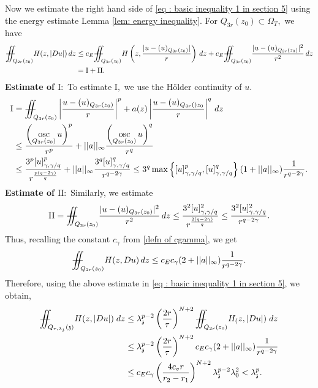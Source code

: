 \documentclass[notitlepage,11pt,reqno]{amsart}
\theoremstyle{definition}
\numberwithin{equation}{section}
\DeclareMathOperator*{\osc}{osc}
\newcommand{\iintss}{{\int\hspace{-0.28cm}\int}}
\newcommand{ \miints }{{\iintss\hspace{-0.56cm} -\hspace{-0.15cm}-}}
\newcommand{\miint}[1]{{\miints_{\hspace{-0.13cm}#1}}}
\begin{document}
Now we estimate the right hand side of \eqref{eq : basic inequality 1 in section 5} using the energy estimate Lemma \ref{lem: energy inequality}. For $Q_{3r}(z_0) \subset \Omega_T,$ we have
\begin{align*}
  \miint{Q_{2r}(z_0)}H(z, |Du|)\, dz &\leq c_E \miint{Q_{3r}(z_0)} H\left(z, \frac{|u-(u)_{Q_{3r}(z_0)}|}{r}\right)\, dz+c_E \miint{Q_{3r}(z_0)}\frac{|u-(u)_{Q_{3r}(z_0)}|^2}{r^2}\, dz\\
  &=\mathrm{I}+\mathrm{II}.
\end{align*}
\textbf{Estimate of $\mathrm{I}:$} To estimate $\mathrm{I},$ we use the H\"{o}lder continuity of $u.$
\begin{align*}
\mathrm{I}&=\miint{Q_{3r}(z_0)}\left|\frac{u-(u)_{Q_{3r}(z_0)}}{r}\right|^p+a(z)\left|\frac{u-(u)_{Q_{3r}()z_0}}{r}\right|^q\, dz\\
&\leq \frac{\left(\displaystyle{\osc_{Q_{3r}(z_0)} u}\right)^p}{r^p}+||a||_{\infty} \frac{\left(\displaystyle{\osc_{Q_{3r}(z_0)} u}\right)^q}{r^q}\\
&\le \frac{3^p[u]^p_{\gamma, \gamma/q}}{r^{\frac{p(q-2\gamma)}{q}}}+||a||_{\infty}\frac{3^q[u]^q_{\gamma, \gamma/q}}{r^{q-2\gamma}}\leq 3^q\max\left\{[u]^p_{\gamma, \gamma/q}, [u]^q_{\gamma, \gamma/q}\right\} (1+||a||_{\infty})\frac{1}{r^{q-2\gamma}}.
\end{align*}
\textbf{Estimate of $\mathrm{II}:$} Similarly, we estimate
\begin{align*}
\mathrm{II}=\miint{Q_{3r}(z_0)}\frac{|u-(u)_{Q_{3r}(z_0)}|^2}{r^2}\, dz \leq \frac{3^2[u]^2_{\gamma, \gamma/q}}{r^{\frac{2(q-2\gamma)}{q}}} \leq \frac{3^2[u]^2_{\gamma, \gamma/q}}{r^{q-2\gamma}}.     
\end{align*}
Thus, recalling the constant $c_{\gamma}$ from \eqref{defn of cgamma}, we get
\begin{align}\label{eq: estimate of H by lambda_0}
    \miint{Q_{2r}(z_0)}H(z, Du)\, dz\leq c_E c_{\gamma} (2+||a||_{\infty})\frac{1}{r^{q-2\gamma}}.
\end{align}
Therefore, using the above estimate in \eqref{eq : basic inequality 1 in section 5}, we obtain,
\begin{align*}
 \miint{Q_{\tau,\lambda_\mathfrak{z}}(\mathfrak{z})} H(z,|Du|)\; dz &\leq \lambda_\mathfrak{z}^{p-2}\left(\frac{2r}{\tau}\right)^{N+2}\miint{Q_{2r}(z_0)} H_(z,|Du|)\; dz\nonumber\\
 &\leq  \lambda_\mathfrak{z}^{p-2}\left(\frac{2r}{\tau}\right)^{N+2} c_Ec_{\gamma}(2+||a||_{\infty})\frac{1}{r^{q-2\gamma}}\nonumber\\
 &\leq c_Ec_{\gamma}\left(\frac{4c_vr}{r_2-r_1}\right)^{N+2}\lambda^{p-2}_{\mathfrak{z}}\lambda^2_0< \lambda^p_{\mathfrak{z}}.
\end{align*}
\end{document}
